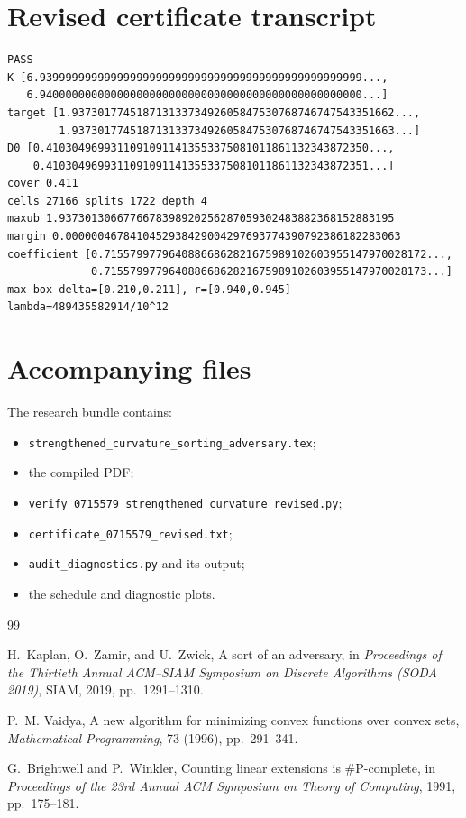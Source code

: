 \documentclass[11pt]{article}
\theoremstyle{definition}
\begin{document}
\section{Revised certificate transcript}
\begin{lstlisting}[language={}]
PASS
K [6.93999999999999999999999999999999999999999999999999...,
   6.94000000000000000000000000000000000000000000000000...]
target [1.93730177451871313373492605847530768746747543351662...,
        1.93730177451871313373492605847530768746747543351663...]
D0 [0.41030496993110910911413553375081011861132343872350...,
    0.41030496993110910911413553375081011861132343872351...]
cover 0.411
cells 27166 splits 1722 depth 4
maxub 1.9373013066776678398920256287059302483882368152883195
margin 0.0000004678410452938429004297693774390792386182283063
coefficient [0.71557997796408866862821675989102603955147970028172...,
             0.71557997796408866862821675989102603955147970028173...]
max box delta=[0.210,0.211], r=[0.940,0.945]
lambda=489435582914/10^12
\end{lstlisting}

\section{Accompanying files}
The research bundle contains:
\begin{itemize}
  \item \texttt{strengthened\_curvature\_sorting\_adversary.tex};
  \item the compiled PDF;
  \item \texttt{verify\_0715579\_strengthened\_curvature\_revised.py};
  \item \texttt{certificate\_0715579\_revised.txt};
  \item \texttt{audit\_diagnostics.py} and its output;
  \item the schedule and diagnostic plots.
\end{itemize}

\begin{thebibliography}{99}

H.~Kaplan, O.~Zamir, and U.~Zwick,
\newblock A sort of an adversary,
\newblock in \emph{Proceedings of the Thirtieth Annual ACM--SIAM Symposium on Discrete Algorithms (SODA 2019)}, SIAM, 2019, pp.~1291--1310.

P.~M. Vaidya,
\newblock A new algorithm for minimizing convex functions over convex sets,
\newblock \emph{Mathematical Programming}, 73 (1996), pp.~291--341.

G.~Brightwell and P.~Winkler,
\newblock Counting linear extensions is \#P-complete,
\newblock in \emph{Proceedings of the 23rd Annual ACM Symposium on Theory of Computing}, 1991, pp.~175--181.

\end{thebibliography}
\end{document}

